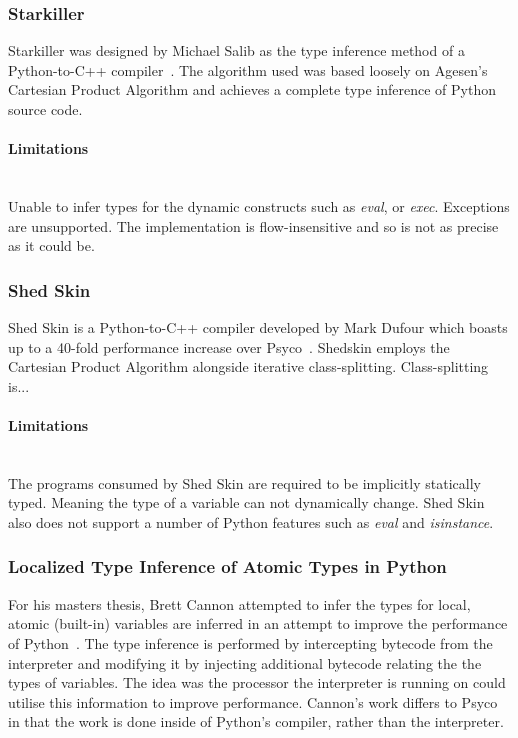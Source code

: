 \documentclass[12pt, titlepage]{article}
\begin{document}
\subsubsection{Starkiller}
Starkiller was designed by Michael Salib as the type inference method of a Python-to-C++ compiler~\cite{starkiller}. The algorithm used was based loosely on Agesen’s Cartesian Product Algorithm and achieves a complete type inference of Python source code.
\paragraph*{Limitations}\mbox{}\\
Unable to infer types for the dynamic constructs such as \textit{eval}, or \textit{exec}. Exceptions are unsupported. The implementation is flow-insensitive and so is not as precise as it could be.

\subsubsection{Shed Skin}
Shed Skin is a Python-to-C++ compiler developed by Mark Dufour which boasts up to a 40-fold performance increase over Psyco~\cite{shedskin}. Shedskin employs the Cartesian Product Algorithm alongside iterative class-splitting. Class-splitting is...

\paragraph*{Limitations}\mbox{}\\
The programs consumed by Shed Skin are required to be implicitly statically typed. Meaning the type of a variable can not dynamically change. Shed Skin also does not support a number of Python features such as \textit{eval} and \textit{isinstance}.

\subsubsection{Localized Type Inference of Atomic Types in Python}
For his masters thesis, Brett Cannon attempted to infer the types for local, atomic (built-in) variables are inferred in an attempt to improve the performance of Python~\cite{cannonlocalizedtype}. The type inference is performed by intercepting bytecode from the interpreter and modifying it by injecting additional bytecode relating the the types of variables. The idea was the processor the interpreter is running on could utilise this information to improve performance. Cannon's work differs to Psyco in that the work is done inside of Python's compiler, rather than the interpreter.
\end{document}
